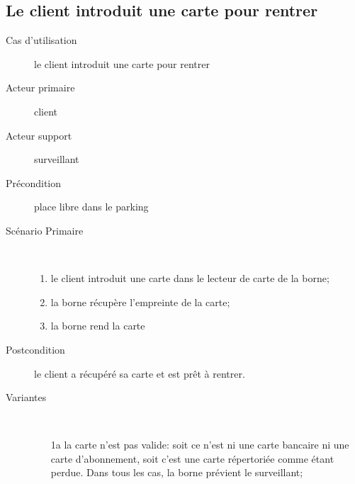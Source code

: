 \documentclass[a4paper]{article}
\begin{document}
\subsection{Le client introduit une carte pour rentrer}
\begin{description}
	\item[Cas d'utilisation] le client introduit une carte pour rentrer
	\item[Acteur primaire] client
	\item[Acteur support] surveillant
	\item[Pr\'econdition] place libre dans le parking
	\item[Sc\'enario Primaire] \
	\begin{enumerate}
		\item le client introduit une carte dans le lecteur de carte de la borne;
		\item la borne r\'ecup\`ere l'empreinte de la carte;
		\item la borne rend la carte
	\end{enumerate}
	\item[Postcondition] le client a r\'ecup\'er\'e sa carte et est pr\^et \`a rentrer.
	\item[Variantes] \
	\begin{enumerate}
		\item[1a] la carte n'est pas valide: soit ce n'est ni une carte bancaire
			ni une carte d'abonnement, soit c'est une carte r\'epertori\'ee
			comme \'etant perdue. Dans tous les cas, la borne pr\'evient le
			surveillant;
	\end{enumerate}
\end{description}
\end{document}
